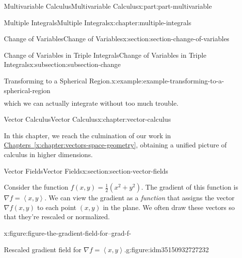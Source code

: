 \documentclass[twoside,10pt,]{book}
\newcommand{\xreffont}{\relax}
\numberwithin{equation}{part}
\newcommand{\grad}{\nabla}
\newcommand{\dotprod}[1]{\left\langle #1 \right\rangle}
\begin{document}
\begin{partptx}{Multivariable Calculus}{}{Multivariable Calculus}{}{}{x:part:part-multivariable}
\begin{chapterptx}{Multiple Integrals}{}{Multiple Integrals}{}{}{x:chapter:multiple-integrals}
\begin{sectionptx}{Change of Variables}{}{Change of Variables}{}{}{x:section:section-change-of-variables}
\begin{subsectionptx}{Change of Variables in Triple Integrals}{}{Change of Variables in Triple Integrals}{}{}{x:subsection:subsection-change}
\begin{example}{Transforming to a Spherical Region.}{x:example:example-transforming-to-a-spherical-region}
\begin{align*}
\end{align*}
which we can actually integrate without too much trouble.%
\end{example}
\end{subsectionptx}
\end{sectionptx}
\end{chapterptx}
%
\typeout{************************************************}
\typeout{************************************************}
%
\begin{chapterptx}{Vector Calculus}{}{Vector Calculus}{}{}{x:chapter:vector-calculus}
\begin{introduction}{}%
In this chapter, we reach the culmination of our work in \hyperref[x:chapter:vectors-space-geometry]{Chapters~{\xreffont\ref{x:chapter:vectors-space-geometry}}\textendash{}{\xreffont\ref{x:chapter:multiple-integrals}}}, obtaining a unified picture of calculus in higher dimensions.%
\end{introduction}%
%
%
\typeout{************************************************}
\typeout{************************************************}
%
\begin{sectionptx}{Vector Fields}{}{Vector Fields}{}{}{x:section:section-vector-fields}
\begin{introduction}{}%
Consider the function \(f(x,y) = \frac{1}{2}(x^{2} + y^{2})\). The gradient of this function is \(\grad f = \dotprod{x,y}\). We can view the gradient as a \emph{function} that assigns the vector \(\grad f(x,y)\) to each point \((x,y)\) in the plane. We often draw these vectors so that they're rescaled or normalized. \begin{figureptx}{}{x:figure:figure-the-gradient-field-for--grad-f-}{}%
\begin{sidebyside}{2}{0}{0}{0}%
\begin{sbspanel}{0.5}%
\begin{subfigureptx}{Rescaled gradient field for \(\grad f = \dotprod{x,y}\).}{g:figure:idm35150932727232}{}%

\end{subfigureptx}
\end{sbspanel}
\end{sidebyside}
\end{figureptx}
\end{introduction}
\end{sectionptx}
\end{chapterptx}
\end{partptx}
\end{document}
